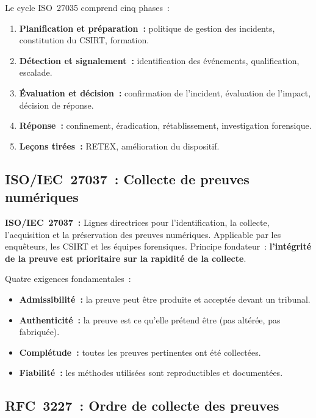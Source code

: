 Le cycle ISO~27035 comprend cinq phases~:
\begin{enumerate}
  \item \textbf{Planification et préparation~:} politique de gestion des incidents,
        constitution du CSIRT, formation.
  \item \textbf{Détection et signalement~:} identification des événements,
        qualification, escalade.
  \item \textbf{Évaluation et décision~:} confirmation de l'incident, évaluation
        de l'impact, décision de réponse.
  \item \textbf{Réponse~:} confinement, éradication, rétablissement, investigation
        forensique.
  \item \textbf{Leçons tirées~:} RETEX, amélioration du dispositif.
\end{enumerate}

\subsection{ISO/IEC~27037~: Collecte de preuves numériques}

\begin{boxdef}
\textbf{ISO/IEC~27037~:} Lignes directrices pour l'identification, la collecte,
l'acquisition et la préservation des preuves numériques. Applicable par les
enquêteurs, les CSIRT et les équipes forensiques. Principe fondateur~:
\textbf{l'intégrité de la preuve est prioritaire sur la rapidité de la collecte}.
\end{boxdef}

Quatre exigences fondamentales~:
\begin{itemize}
  \item \textbf{Admissibilité~:} la preuve peut être produite et acceptée
        devant un tribunal.
  \item \textbf{Authenticité~:} la preuve est ce qu'elle prétend être
        (pas altérée, pas fabriquée).
  \item \textbf{Complétude~:} toutes les preuves pertinentes ont été collectées.
  \item \textbf{Fiabilité~:} les méthodes utilisées sont reproductibles et
        documentées.
\end{itemize}

\subsection{RFC~3227~: Ordre de collecte des preuves}

